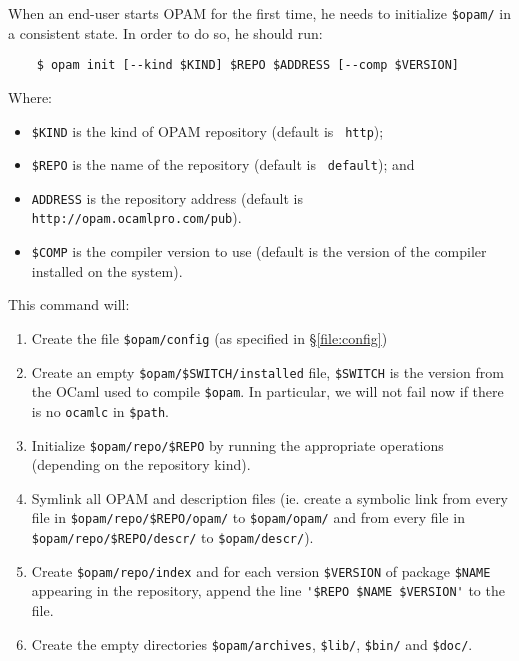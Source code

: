 \documentclass[a4paper,11pt]{article}
\begin{document}
When an end-user starts OPAM for the first time, he needs to
initialize \verb+$opam/+ in a consistent state. In order to do so, he
should run:

\begin{verbatim}
    $ opam init [--kind $KIND] $REPO $ADDRESS [--comp $VERSION]
\end{verbatim}

Where:
\begin{itemize}
\item \verb+$KIND+ is the kind of OPAM repository (default is {\tt
  http});
\item \verb+$REPO+ is the name of the repository (default is {\tt
  default}); and
\item \verb+ADDRESS+ is the repository address (default is
  \verb+http://opam.ocamlpro.com/pub+).
\item \verb+$COMP+ is the compiler version to use (default is the
  version of the compiler installed on the system).
\end{itemize}

This command will:

\begin{enumerate}

\item Create the file \verb+$opam/config+ (as specified in
  \S\ref{file:config})

\item Create an empty \verb+$opam/$SWITCH/installed+ file,
  \verb+$SWITCH+ %
  is the version from the OCaml used to compile \verb+$opam+.
  In particular, we will not fail now
  if there is no \verb+ocamlc+ in \verb+$path+.

\item Initialize \verb+$opam/repo/$REPO+ by running the
  appropriate operations (depending on the repository kind).

\item Symlink all OPAM and description files (ie. create a symbolic
  link from every file in \verb+$opam/repo/$REPO/opam/+ to
  \verb+$opam/opam/+ and from every file in
  \verb+$opam/repo/$REPO/descr/+ to \verb+$opam/descr/+).

\item Create \verb+$opam/repo/index+ and for each version
  \verb+$VERSION+ of package \verb+$NAME+ appearing in the repository,
  append the line \verb+'$REPO $NAME $VERSION'+ to the file.

\item Create the empty directories \verb+$opam/archives+,
  \verb+$lib/+, \verb+$bin/+ and \verb+$doc/+.

\end{enumerate}
\end{document}
